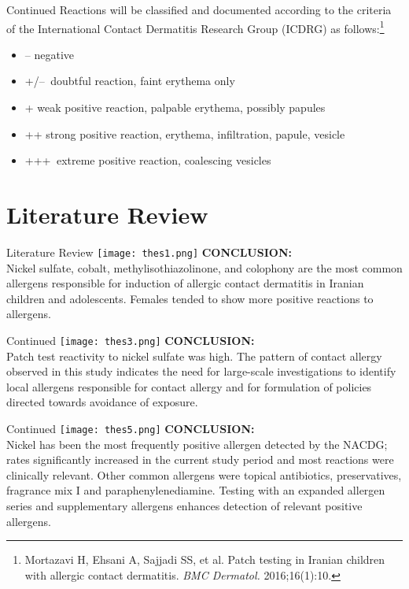\documentclass[11pt]{beamer}
\begin{document}
\begin{frame}{Continued}
Reactions will be classified and documented according to the criteria of the International Contact Dermatitis Research Group (ICDRG) as follows:\footnote{Mortazavi H, Ehsani A, Sajjadi SS, et al. Patch testing in Iranian children with allergic contact dermatitis. \textit{BMC Dermatol.} 2016;16(1):10. }
\begin{itemize}
\item -- negative 
\item +/--  doubtful reaction, faint erythema only 
\item +	weak positive reaction, palpable erythema, possibly papules
\item ++ strong positive reaction, erythema, infiltration, papule, vesicle 
\item +++  extreme positive reaction, coalescing vesicles

\end{itemize}
\end{frame}

\section{Literature Review}

\begin{frame}{Literature Review}
\texttt{[image: thes1.png]}
\vspace{3pt}
\textbf{CONCLUSION:}\\
Nickel sulfate, cobalt, methylisothiazolinone, and colophony are the most common allergens responsible for induction of allergic contact dermatitis in Iranian children and adolescents. Females tended to show more positive reactions to allergens.
\end{frame}



\begin{frame}{Continued}
\texttt{[image: thes3.png]}
\vspace{5pt}
\textbf{CONCLUSION:}\\
Patch test reactivity to nickel sulfate was high. The pattern of contact allergy observed in this study indicates the need for large-scale investigations to identify local allergens responsible for contact allergy and for formulation of policies directed towards avoidance of exposure.
\end{frame}

\begin{frame}{Continued}
\texttt{[image: thes5.png]}
\vspace{5pt}
\textbf{CONCLUSION:}\\
Nickel has been the most frequently positive allergen detected by the NACDG; rates significantly increased in the current study period and most reactions were clinically relevant. Other common allergens were topical antibiotics, preservatives, fragrance mix I and paraphenylenediamine. Testing with an expanded allergen series and supplementary allergens enhances detection of relevant positive allergens.
\end{frame}
\end{document}
